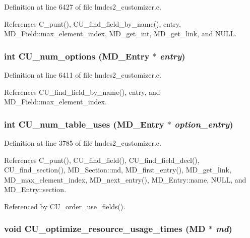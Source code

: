 Definition at line 6427 of file lmdes2\_\-customizer.c.

References C\_\-punt(), CU\_\-find\_\-field\_\-by\_\-name(), entry, MD\_\-Field::max\_\-element\_\-index, MD\_\-get\_\-int, MD\_\-get\_\-link, and NULL.
\subsubsection{\setlength{\rightskip}{0pt plus 5cm}int CU\_\-num\_\-options (\bf{MD\_\-Entry} $\ast$ {\em entry})}\label{lmdes2__customizer_8c_b856325e80c0fe729a87901b233899df}




Definition at line 6411 of file lmdes2\_\-customizer.c.

References CU\_\-find\_\-field\_\-by\_\-name(), entry, and MD\_\-Field::max\_\-element\_\-index.
\subsubsection{\setlength{\rightskip}{0pt plus 5cm}int CU\_\-num\_\-table\_\-uses (\bf{MD\_\-Entry} $\ast$ {\em option\_\-entry})}\label{lmdes2__customizer_8c_fdf290d1fef84d92c3a52bb51e638226}




Definition at line 3785 of file lmdes2\_\-customizer.c.

References C\_\-punt(), CU\_\-find\_\-field(), CU\_\-find\_\-field\_\-decl(), CU\_\-find\_\-section(), MD\_\-Section::md, MD\_\-first\_\-entry(), MD\_\-get\_\-link, MD\_\-max\_\-element\_\-index, MD\_\-next\_\-entry(), MD\_\-Entry::name, NULL, and MD\_\-Entry::section.

Referenced by CU\_\-order\_\-use\_\-fields().
\subsubsection{\setlength{\rightskip}{0pt plus 5cm}void CU\_\-optimize\_\-resource\_\-usage\_\-times (\bf{MD} $\ast$ {\em md})}\label{lmdes2__customizer_8c_772a2fd220caf518585c5ed7bfe622be}




